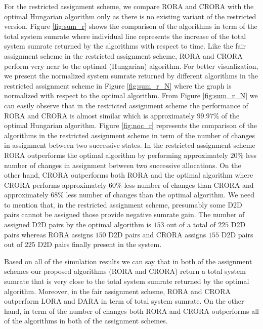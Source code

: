 \documentclass[times]{dacauth}
\begin{document}
\smallskip
\noindent
For the restricted assignment scheme, we compare RORA and CRORA with the optimal Hungarian algorithm only as there is no existing variant of the restricted version. Figure \ref{fig:sum_r} shows the comparison of the algorithms in term of the total system sumrate where individual line represents the increase of the total system sumrate returned by the algorithms with respect to time. Like the fair assignment scheme in the restricted assignment scheme, RORA and CRORA perform very near to the optimal (Hungarian) algorithm. For better visualization, we present the normalized system sumrate returned by different algorithms in the restricted assignment scheme in Figure \ref{fig:sum_r_N} where the graph is normalized with respect to the optimal algorithm. From Figure \ref{fig:sum_r_N} we can easily observe that in the restricted assignment scheme the performance of RORA and CRORA is almost similar which is approximately $99.97\%$ of the optimal Hungarian algorithm. Figure  \ref{fig:noc_r} represents the comparison of the algorithms in the restricted assignment scheme in term of the number of changes in assignment between two successive states. In the restricted assignment scheme RORA outperforms the optimal algorithm by performing approximately $20\%$ less number of changes in assignment between two successive allocations. On the other hand,  CRORA outperforms both RORA and the optimal algorithm where CRORA performs  approximately $60\%$ less number of changes than CRORA and approximately 68\% less number of changes than the optimal algorithm. We need to mention that, in the restricted assignment scheme, presumably some D2D pairs cannot be assigned those provide negative sumrate gain. The number of assigned D2D pairs by the optimal algorithm is $153$ out of a total of $225$ D2D pairs whereas RORA assigns $150$ D2D pairs and CRORA assigns $155$ D2D pairs out of $225$ D2D pairs finally present in the system.  

\smallskip
\noindent
Based on all of the simulation results we can say that in both of the assignment schemes our proposed algorithms (RORA and CRORA) return a total system sumrate that is very close to the total system sumrate returned by the optimal algorithm. Moreover, in the fair assignment scheme, RORA and CRORA outperform LORA and DARA in term of total system sumrate. On the other hand, in term of the number of changes both RORA and CRORA outperforms all of the algorithms in both of the assignment schemes.
\vspace {-0.3cm}
\end{document}
